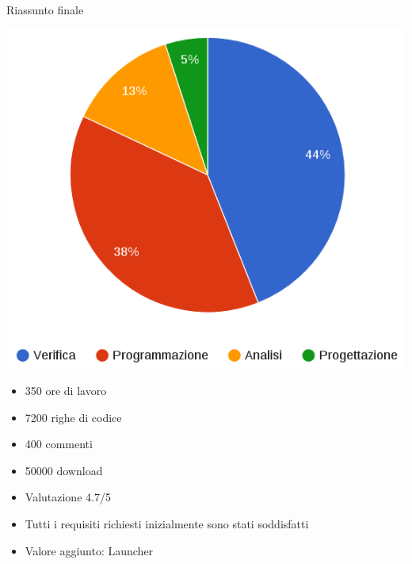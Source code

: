 	\subsection{}
		\begin{frame}{Riassunto finale}
			\begin{minipage}{0.49\textwidth}
				\includegraphics[width=1.0\textwidth]{capitolo_4/immagini/riassunto_ore.png}
			\end{minipage}
			\begin{minipage}{0.49\textwidth}
				\begin{itemize}
					\item 350 ore di lavoro
					\item 7200 righe di codice
					\item 400 commenti
					\item 50000 download
					\item Valutazione 4.7/5
				\end{itemize}
			\end{minipage}\par
			\vspace{3mm}
			\begin{itemize}
				\item Tutti i requisiti richiesti inizialmente sono stati soddisfatti
				\item Valore aggiunto: \alert{Launcher}
			\end{itemize}
		\end{frame}
